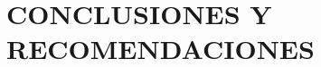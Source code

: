 \chapter{CONCLUSIONES Y RECOMENDACIONES}

\begin{comment}
    

\section{Conclusiones}

\begin{enumerate}
    \item \textbf{Eficacia de la Geoestadística:}\\
    El estudio no solo resalta la eficacia de las técnicas geoestadísticas, sino que también destaca su versatilidad y adaptabilidad en contextos ambientales complejos. Kriging, por ejemplo, proporciona no solo estimaciones confiables en ubicaciones no muestradas, sino que también muestra cómo las variables ambientales interactúan espacialmente al incorporar modelos de variogramas. Esta técnica permite una comprensión más profunda de las dinámicas espaciales y se puede adaptar para incorporar múltiples fuentes de datos, lo que mejora la precisión y utilidad de las estimaciones. La inclusión de análisis de sensibilidad y validación cruzada fortalece la confianza en las predicciones y ofrece un marco sólido para tomar decisiones basadas en datos.
    
    \item \textbf{Variabilidad Espacial y Calidad del Agua:}\\
    La variabilidad espacial en la calidad del agua no es solo un fenómeno observado; refleja una compleja red de interacciones entre factores ecológicos, geológicos y antropogénicos. Identificar áreas con alteraciones significativas en parámetros críticos no solo ayuda con la planificación de la gestión ambiental, sino que también prioriza intervenciones. Profundizar en modelos espaciales que consideren factores, como el uso del suelo, la proximidad a fuentes de contaminación y tendencias históricas, puede revelar patrones aún más complejos. Además, este estudio podría expandirse para explorar las implicaciones a largo plazo de estas variaciones, como sus posibles efectos en la biodiversidad acuática y la salud humana.
    

\end{comment}
